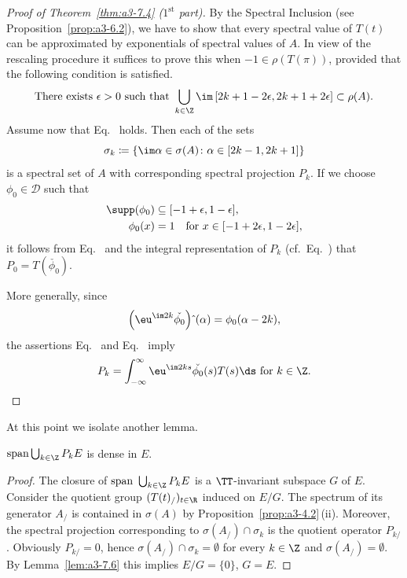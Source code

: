 \begin{proof}[Proof of Theorem~\ref{thm:a3-7.4} ($1^{\text{st}} $ part)]
By the Spectral Inclusion (see Proposition~\ref{prop:a3-6.2}), we have to show that every spectral value of\/ $T(t)$ can be approximated by exponentials of spectral values of\/ $A$.
In view of the rescaling procedure it suffices to prove this when $-1 \in \rho(T(\pi))$, provided that the following condition is satisfied.
\begin{equation}\label{eq:a3-7.4}
	\text{There exists } \epsilon > 0 \text{ such that } \bigcup_{k\in\Z} \im\,[2k+1-2\epsilon,2k+1+2\epsilon] \subset 	\rho(A) .
\end{equation}
Assume now that Eq.~ holds.
Then each of the sets 
\[
	\sigma_{k}\coloneqq \{\im\alpha \in \sigma(A) \colon \alpha \in [2k-1,2k+1]\}
\] 
is a spectral set of\/ $A$ with corresponding spectral projection $P_{k}$.
If we choose $\phi_{0} \in \mathcal{D}$ such that 
\begin{align*}
	\supp(\phi_{0}) &\subseteq [-1+\epsilon,1-\epsilon], \\
	\phi_{0}(x) & = 1 \quad \text{for $x \in [-1 + 2\epsilon,1 - 2\epsilon]$}, 
\end{align*}
it follows from Eq.~ and the integral representation of\/ $P_{k}$ (cf.\ Eq.~) that $P_{0} = T(\check{\phi_{0}})$.

More generally, since %
\[
	\left(\eu^{\im 2k}\check{\phi_{0}}\right){\hat{ }}\,(\alpha) = \phi_{0}(\alpha-2k) ,
\]
%
the assertions Eq.~ and Eq.~ imply
\begin{equation}\label{eq:a3-7.5}
P_{k} = \int_{-\infty}^{\infty} \eu^{\im 2ks}\check{\phi_{0}}(s)T(s)\ds \text{ for } k \in \Z .
\end{equation}
\end{proof}
At this point we isolate another lemma.
\begin{lemma}\label{lem:a3-7.7}
$\mathrm{span }\bigcup_{k\in\Z} P_{k}E$ is dense in $E$.
\end{lemma}
\begin{proof}
The closure of\/ $\text{span }\bigcup_{k\in\Z} P_{k}E$ is a $\TT$-invariant subspace $G$ of\/ $E$.
Consider the quotient group $(T(t)_/)_{t\in\R}$ induced on $E/G$.
The spectrum of its generator $A_{/}$ is contained in $\sigma(A)$ by Proposition~\ref{prop:a3-4.2}\,(ii).
Moreover, the spectral projection corresponding to $\sigma(A_{/}) \cap \sigma_{k}$ is the quotient operator $P_{k/}$.
Obviously $P_{k/} = 0$, hence $\sigma(A_{/}) \cap \sigma_{k} = \emptyset$ for every $k \in \Z$ and $\sigma(A_{/}) = \emptyset$.
By Lemma~\ref{lem:a3-7.6} this implies $E/G = \{0\}$, \ie $G = E$.
\end{proof}
